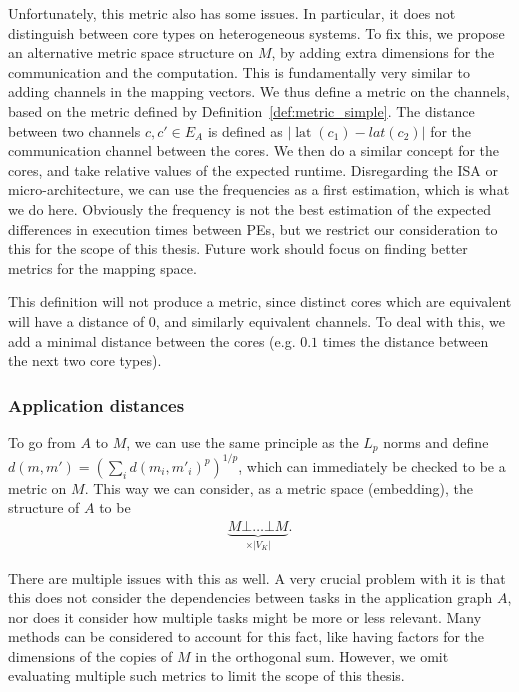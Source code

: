 Unfortunately, this metric also has some issues.
In particular, it does not distinguish between core types on heterogeneous systems.
To fix this, we propose an alternative metric space structure on $M$, by adding extra dimensions for the communication and the computation.
This is fundamentally very similar to adding channels in the mapping vectors.
We thus define a metric on the channels, based on the metric defined by Definition~\ref{def:metric_simple}.
The distance between two channels $c,c' \in E_A$ is defined as $|\operatorname{lat}(c_1) - lat(c_2)|$ for the communication channel between the cores.
We then do a similar concept for the cores, and take relative values of the expected runtime. 
Disregarding the \ac{ISA} or micro-architecture, we can use the frequencies as a first estimation, which is what we do here.
Obviously the frequency is not the best estimation of the expected differences in execution times between \acp{PE}, but we restrict our consideration to this for the scope of this thesis.
Future work should focus on finding better metrics for the mapping space.

This definition will not produce a metric, since distinct cores which are equivalent will have a distance of $0$, and similarly equivalent channels. 
To deal with this, we add a minimal distance between the cores (e.g. $0.1$ times the distance between the next two core types).

\subsubsection{Application distances}

To go from $A$ to $M$, we can use the same principle as the $L_p$ norms and define $d(m,m') = (\sum_i d(m_i,m'_i)^p)^{1/p}$, which can immediately be checked to be a metric on $M$.
This way we can consider, as a metric space (embedding), the structure of $A$ to be
 \begin{align} \label{eqn:orthogonal_sum} \underbrace{M \bot \ldots \bot M}_{ \times |V_K|}. \end{align} 

There are multiple issues with this as well. 
A very crucial problem with it is that this does not consider the dependencies between tasks in the application graph $A$, nor does it consider how multiple tasks might be more or less relevant.
Many methods can be considered to account for this fact, like having factors for the dimensions of the copies of $M$ in the orthogonal sum.
However, we omit evaluating multiple such metrics to limit the scope of this thesis.

